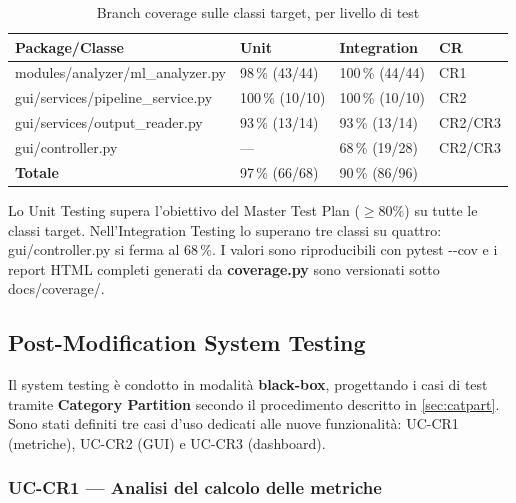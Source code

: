 \documentclass[11pt,a4paper]{article}
\makeatletter
\newif\ifmark@prevlower
\def\mark@casebreak#1{%
  \ifcat\noexpand#1\relax
    \mark@prevlowerfalse
  \else
    \ifnum`#1=\uccode`#1\relax
      \ifmark@prevlower\allowbreak\fi
      \mark@prevlowerfalse
    \else
      \ifnum`#1=\lccode`#1\relax
        \mark@prevlowertrue
      \else
        \mark@prevlowerfalse
      \fi
    \fi
  \fi}
\def\mark@brk#1{%
  \ifx#1\mark@stop
    \let\mark@next\relax
  \else
    \mark@casebreak{#1}%
    #1%
    \ifx#1.\allowbreak\else
      \ifx#1\_\allowbreak\else
        \ifx#1/\allowbreak\else
          \ifx#1(\allowbreak\fi
        \fi
      \fi
    \fi
    \let\mark@next\mark@brk
  \fi
  \mark@next}
\def\mark@stop{\mark@stop}
\DeclareRobustCommand{\mark@code}[1]{%
  \ifmmode
    \text{\ttfamily\small\mark@prevlowerfalse\mark@brk#1\mark@stop}%
  \else
    {\ttfamily\small\mark@prevlowerfalse\mark@brk#1\mark@stop}%
  \fi}
\DeclareRobustCommand{\pkgpath}[1]{\mark@code{#1}}
\def\mark@code#1{#1}%
\def\pkgpath#1{#1}%
\def\cmd#1{#1}%
\def\tagok#1{#1}%
\DeclareRobustCommand{\cmd}[1]{\texttt{\small #1}}
\newcommand{\tagok}[1]{\textbf{#1}}
\newcommand{\thead}[1]{\textbf{#1}}
\makeatother
\begin{document}
\begin{table}[H]
  \centering\small
  \caption{Branch coverage sulle classi target, per livello di test}
  \label{tab:cov}
  \begin{tabularx}{\linewidth}{@{}L{5.6cm} C{2.6cm} C{2.6cm} Y@{}}
    \toprule
    \thead{Package/Classe} & \thead{Unit} & \thead{Integration} & \thead{CR}\\
    \midrule
    \pkgpath{modules/analyzer/ml\_analyzer.py} &
      98\,\% (43/44) & 100\,\% (44/44) & CR1\\
    \pkgpath{gui/services/pipeline\_service.py} &
      100\,\% (10/10) & 100\,\% (10/10) & CR2\\
    \pkgpath{gui/services/output\_reader.py} &
      93\,\% (13/14) & 93\,\% (13/14) & CR2/CR3\\
    \pkgpath{gui/controller.py} &
      --- & 68\,\% (19/28) & CR2/CR3\\
    \midrule
    \textbf{Totale} & \tagok{97\,\% (66/68)} & \tagok{90\,\% (86/96)} & \\
    \bottomrule
  \end{tabularx}
\end{table}

Lo Unit Testing supera l'obiettivo del Master Test Plan ($\geq 80\%$) su
tutte le classi target. Nell'Integration Testing lo superano tre classi su
quattro: \pkgpath{gui/controller.py} si ferma al 68\,\%. I valori sono
riproducibili con \cmd{pytest -{}-cov} e i report HTML completi generati da
\textbf{coverage.py} sono versionati sotto \pkgpath{docs/coverage/}.

\subsection{Post-Modification System Testing}
\label{sec:st}

Il system testing \`e condotto in modalit\`a \textbf{black-box}, progettando i
casi di test tramite \textbf{Category Partition} secondo il procedimento
descritto in \cref{sec:catpart}. Sono stati definiti tre casi d'uso dedicati
alle nuove funzionalit\`a: UC-CR1 (metriche), UC-CR2 (GUI) e UC-CR3 (dashboard).

\subsubsection{UC-CR1 --- Analisi del calcolo delle metriche}
\label{sec:st-cr1}
\end{document}
